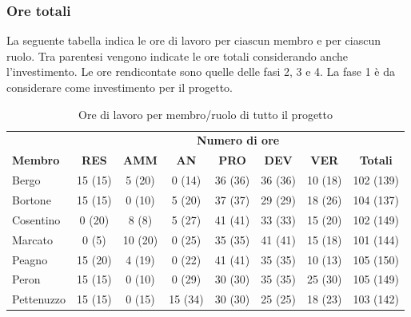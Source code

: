 	\subsubsection{Ore totali}
		La seguente tabella indica le ore di lavoro per ciascun membro e per ciascun ruolo. Tra parentesi vengono indicate le ore totali considerando anche l'investimento. Le ore rendicontate sono quelle delle fasi 2, 3 e 4. La fase 1 è da considerare come investimento per il progetto.
		\begin{table}[H]
			\centering
			\begin{tabular}{| l | c c c c c c | c |}
				\rowcolor{LightBlue}
				& \multicolumn{7}{c}{\textbf{\color{white}Numero di ore}}	\\
		
				\rowcolor{LightBlue}
				\textbf{\color{white}Membro}
				& \textbf{\color{white}RES}
				& \textbf{\color{white}AMM}
				& \textbf{\color{white}AN}
				& \textbf{\color{white}PRO}
				& \textbf{\color{white}DEV}
				& \textbf{\color{white}VER}
				& \textbf{\color{white}Totali}\\
		
				Bergo 				& 15 (15) & 5 (20)		& 0 (14)	& 36 (36) & 36 (36) & 10 (18)	& 102 (139)\\
				Bortone 			& 15  (15)  & 0 (10)		& 5	 (20)	& 37 (37) & 29 (29) & 18 (26)	& 104 (137)\\
				Cosentino 		& 0  (20) & 8 (8)		& 5 (27)	& 41 (41) & 33 (33) & 15  (20)	& 102 (149)\\
				Marcato 			& 0 (5) & 10 (20)		& 0  (25)	& 35 (35) & 41 (41) & 15 (18)	& 101 (144)\\
				Peagno 			& 15  (20) & 4 (19)		& 0  (22)	& 41 (41) & 35 (35) & 10 (13)	& 105 (150)\\
				Peron 				& 15 (15) & 0 (10)		& 0  (29)	& 30 (30) & 35 (35) & 25  (30)	& 105 (149)\\
				Pettenuzzo 	& 15 (15) & 0 (15) 	& 15  (34)	& 30 (30) & 25 (25) & 18 (23)	& 103 (142)\\ \hline
			\end{tabular}
			\caption{Ore di lavoro per membro/ruolo di tutto il progetto}
		\end{table}
	
